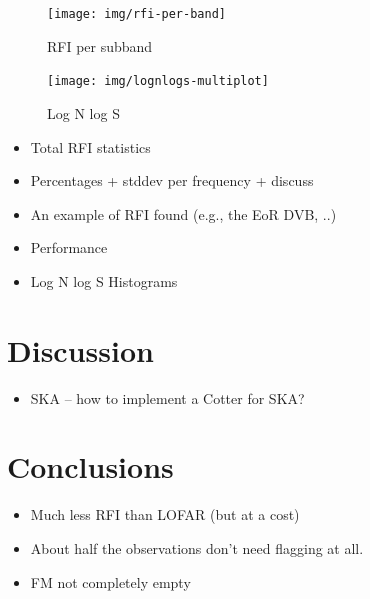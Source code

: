 \documentclass[useAMS,usenatbib]{mn2e}
\begin{document}
\noindent\begin{figure}
\begin{center}\hspace*{-0.2cm}\texttt{[image: img/rfi-per-band]}
\caption{RFI per subband}
\label{fig:rfi-per-band}
\end{center}
\end{figure}

\noindent\begin{figure}
\begin{center}\hspace*{-0.2cm}\texttt{[image: img/lognlogs-multiplot]}
\caption{Log N log S}
\label{fig:lognlogs}
\end{center}
\end{figure}

\begin{itemize}
 \item Total RFI statistics
 \item Percentages + stddev per frequency + discuss
 \item An example of RFI found (e.g., the EoR DVB, ..)
 \item Performance
 \item Log N log S Histograms
\end{itemize}

\section{Discussion}
\begin{itemize}
 \item SKA -- how to implement a Cotter for SKA?
\end{itemize}

\section{Conclusions}
\begin{itemize}
 \item Much less RFI than LOFAR (but at a cost)
 \item About half the observations don't need flagging at all. 
 \item FM not completely empty
\end{itemize}
\end{document}

